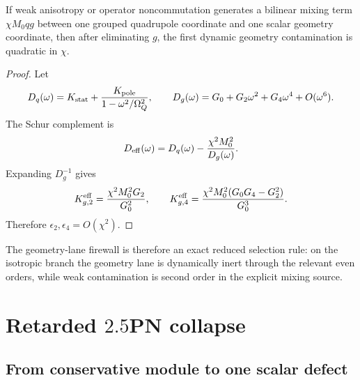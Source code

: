 \begin{proposition}
\label{prop:app-part04-second-order-geometry-contamination}
If weak anisotropy or operator noncommutation generates a bilinear mixing term \(\chi M_0qg\) between one grouped quadrupole coordinate and one scalar geometry coordinate, then after eliminating \(g\), the first dynamic geometry contamination is quadratic in \(\chi\).
\end{proposition}

\begin{proof}
Let
\begin{equation}
D_q(\omega)=K_{\rm stat}+\frac{K_{\rm pole}}{1-\omega^2/\Omega_Q^2},
\qquad
D_g(\omega)=G_0+G_2\omega^2+G_4\omega^4+O(\omega^6).
\end{equation}
The Schur complement is
\begin{equation}
D_{\rm eff}(\omega)=D_q(\omega)-\frac{\chi^2M_0^2}{D_g(\omega)}.
\end{equation}
Expanding \(D_g^{-1}\) gives
\begin{equation}
K_{g,2}^{\rm eff}=\frac{\chi^2M_0^2G_2}{G_0^2},
\qquad
K_{g,4}^{\rm eff}=\frac{\chi^2M_0^2(G_0G_4-G_2^2)}{G_0^3}.
\end{equation}
Therefore \(\epsilon_2,\epsilon_4=O(\chi^2)\).
\end{proof}

The geometry-lane firewall is therefore an exact reduced selection rule: on the isotropic branch the geometry lane is dynamically inert through the relevant even orders, while weak contamination is second order in the explicit mixing source.

\section{Retarded \texorpdfstring{$2.5$}{2.5}PN collapse}
\label{sec:app-part04_geometry_retarded_mouth:retarded-2-5-pn-collapse}

\subsection{From conservative module to one scalar defect}
\label{subsec:app-part04-retarded-one-scalar}

